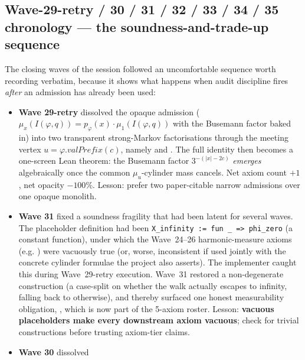 \documentclass[11pt,a4paper]{article}
\theoremstyle{plain}
\theoremstyle{definition}
\begin{document}
\subsection{Wave-29-retry / 30 / 31 / 32 / 33 / 34 / 35 chronology --- the soundness-and-trade-up sequence}\label{sec:w293031}

The closing waves of the session followed an uncomfortable sequence
worth recording verbatim, because it shows what happens when audit
discipline fires \emph{after} an admission has already been used:

\begin{itemize}[leftmargin=1.5em]
\item \textbf{Wave 29-retry} dissolved the opaque admission
      ($\mu_x(I(\varphi,q)) = p_\varphi(x)\cdot \mu_1(I(\varphi,q))$
      with the Busemann factor baked in) into two transparent
      strong-Markov factorisations through the meeting vertex
      $u = \varphi.\mathit{valPrefix}(c)$, namely
       and
      . The full
      identity then becomes a one-screen Lean theorem: the Busemann
      factor $3^{-(|x|-2c)}$ \emph{emerges} algebraically once the
      common $\mu_u$-cylinder mass cancels. Net axiom count $+1$, net
      opacity $-100\%$. Lesson: prefer two paper-citable narrow
      admissions over one opaque monolith.
\item \textbf{Wave 31} fixed a soundness fragility that had been
      latent for several waves. The  placeholder
      definition had been
      \verb|X_infinity := fun _ => phi_zero| (a constant function),
      under which the Wave~24--26 harmonic-measure axioms (e.g.
      ) were vacuously
      true (or, worse, inconsistent if used jointly with the concrete
      cylinder formulae the project also asserts). The implementer
      caught this during Wave~29-retry execution. Wave~31 restored a
      non-degenerate construction (a case-split on whether the walk
      actually escapes to infinity, falling back to 
      otherwise), and thereby surfaced one honest measurability
      obligation, , which is now part of
      the 5-axiom roster. Lesson: \textbf{vacuous placeholders make
      every downstream axiom vacuous}; check for trivial constructions
      before trusting axiom-tier claims.
\item \textbf{Wave 30} dissolved

\end{itemize}
\end{document}
